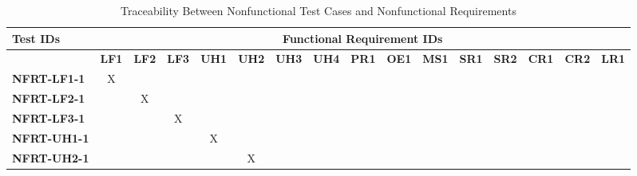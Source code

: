 \documentclass[12pt, titlepage]{article}
\begin{document}
\begin{landscape}
	\newpage

	\begin{longtable}{|l|ccccccccccccccc|}
		\caption{Traceability Between Nonfunctional Test Cases and Nonfunctional Requirements}                                                                                                                                                                                                            \\
		\hline
		\textbf{Test IDs}   & \multicolumn{15}{c|}{\textbf{Functional Requirement IDs}}                                                                                                                                                                                                                   \\
		\hline
		~                   & \textbf{LF1}                                              & \textbf{LF2} & \textbf{LF3} & \textbf{UH1} & \textbf{UH2} & \textbf{UH3} & \textbf{UH4} & \textbf{PR1} & \textbf{OE1} & \textbf{MS1} & \textbf{SR1} & \textbf{SR2} & \textbf{CR1} & \textbf{CR2} & \textbf{LR1} \\
		\hline
		\textbf{NFRT-LF1-1} & X                                                         & ~            & ~            & ~            & ~            & ~            & ~            & ~            & ~            & ~            & ~            & ~            & ~            & ~            & ~            \\
		\textbf{NFRT-LF2-1} & ~                                                         & X            & ~            & ~            & ~            & ~            & ~            & ~            & ~            & ~            & ~            & ~            & ~            & ~            & ~            \\
		\textbf{NFRT-LF3-1} & ~                                                         & ~            & X            & ~            & ~            & ~            & ~            & ~            & ~            & ~            & ~            & ~            & ~            & ~            & ~            \\
		\textbf{NFRT-UH1-1} & ~                                                         & ~            & ~            & X            & ~            & ~            & ~            & ~            & ~            & ~            & ~            & ~            & ~            & ~            & ~            \\
		\textbf{NFRT-UH2-1} & ~                                                         & ~            & ~            & ~            & X            & ~            & ~            & ~            & ~            & ~            & ~            & ~            & ~            & ~            & ~            \\

\end{longtable}
\end{landscape}
\end{document}
